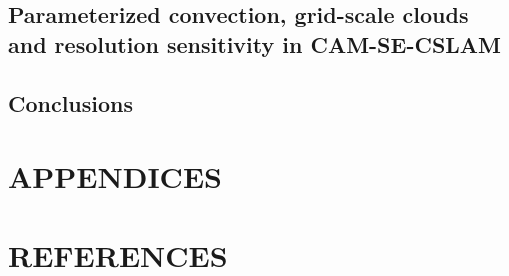 \documentclass[12pt]{article}
\begin{document}
\newpage
\begin{center}
\section{Parameterized convection, grid-scale clouds and resolution sensitivity in CAM-SE-CSLAM} \label{sec:chapter6}
\end{center}


\newpage
\begin{center}
\section{Conclusions}\label{sec:chapter7}
\end{center}


\newpage
\section{APPENDICES}


\newpage
\section*{REFERENCES}
\setlength{\bibsep}{0pt}
{\normalsize
}
\end{document}
